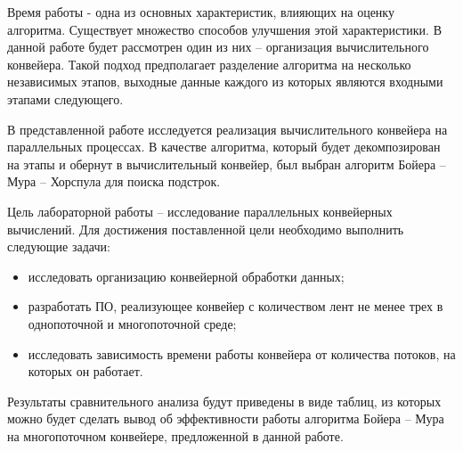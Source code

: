 \setcounter{page}{2}
Время работы - одна из основных характеристик, влияющих на оценку алгоритма. Существует множество способов улучшения этой характеристики. В данной работе будет рассмотрен один из них -- организация вычислительного конвейера. Такой подход предполагает разделение алгоритма на несколько независимых этапов, выходные данные каждого из которых являются входными этапами следующего. 

В представленной работе исследуется реализация вычислительного конвейера на параллельных процессах.
В качестве алгоритма, который будет декомпозирован на этапы и обернут в вычислительный конвейер, был выбран алгоритм Бойера -- Мура -- Хорспула для поиска подстрок. 

Цель лабораторной работы -- исследование параллельных конвейерных вычислений. Для достижения поставленной цели необходимо выполнить следующие задачи:
\begin{itemize}
	\item исследовать организацию конвейерной обработки данных;
	\item разработать ПО, реализующее конвейер с количеством лент не менее трех в однопоточной и многопоточной среде;
	\item исследовать зависимость времени работы конвейера от количества потоков, на которых он работает. 
\end{itemize}
Результаты сравнительного анализа будут приведены в виде таблиц, из которых можно будет сделать вывод об эффективности работы алгоритма Бойера -- Мура на многопоточном конвейере, предложенной в данной работе.